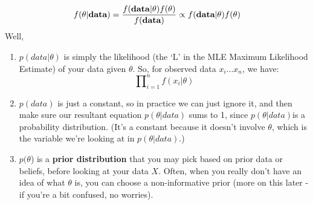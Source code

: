 \documentclass[12pt]{book}
\begin{document}
\begin{equation}
f(\theta|\textbf{data}) = \frac{f(\textbf{\textbf{data}}|\theta)f(\theta)}{f(\textbf{data})} \propto f(\textbf{data}|\theta)f(\theta)
\end{equation}
Well,
  \begin{enumerate} 
          \item $p(data|\theta)$ is simply the likelihood (the `L' in the MLE Maximum Likelihood Estimate) of your data given $\theta$. So, for observed data $x_i$...$x_n$, we have: 
          \begin{equation}
          \prod\nolimits_{i=1}^n f(x_i|\theta)
          \end{equation}
          \item $p(data)$ is just a constant, so in practice we can just ignore it, and then make sure our resultant equation $p(\theta|data)$ sums to 1, since $p(\theta|data)$is a probability distribution. (It's a constant because it doesn't involve $\theta$, which is the variable we're looking at in $p(\theta|data)$.)
         \item  $p(\theta$) is a \textbf{prior distribution} that you may pick based on prior data or beliefs, before looking at your data $X$. Often, when you really don't have an idea of what $\theta$ is, you can choose a non-informative prior (more on this later - if you're a bit confused, no worries).
           \end{enumerate}
\end{document}
